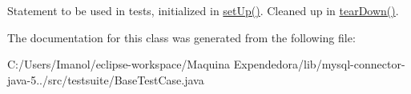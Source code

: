 Statement to be used in tests, initialized in \mbox{\hyperlink{classtestsuite_1_1_base_test_case_a195f5d285c7979328734606d08ad15b1}{set\+Up()}}. Cleaned up in \mbox{\hyperlink{classtestsuite_1_1_base_test_case_a51c7d76ab24b0c966f956250fd7a4f52}{tear\+Down()}}. 

The documentation for this class was generated from the following file\+:\begin{DoxyCompactItemize}
\item 
C\+:/\+Users/\+Imanol/eclipse-\/workspace/\+Maquina Expendedora/lib/mysql-\/connector-\/java-\/5../src/testsuite/Base\+Test\+Case.\+java\end{DoxyCompactItemize}
